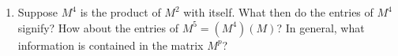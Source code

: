 \begin{enumerate}
\item  Suppose $M^{4}$ is the product of $M^{2}$ with itself.  What
  then do the entries of $M^{4}$ signify?  How about the entries of
  $M^{5}=(M^{4})(M)$?  In general, what information is contained in
  the matrix $M^{p}$?

%


\end{enumerate}

